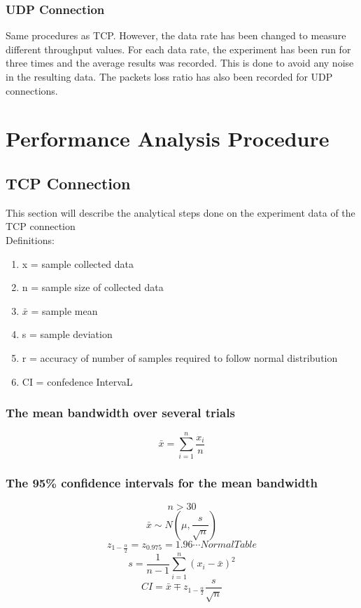 \documentclass[aps,letterpaper,10pt]{revtex4}
\begin{document}
    \subsubsection{UDP Connection}
	Same procedures as TCP. However, the data rate has been changed to measure different throughput values. For each data rate, the experiment has been run for three times and the average results was recorded. This is done to avoid any noise in the resulting data. The packets loss ratio has also been recorded for UDP connections.
\newpage
\section{Performance Analysis Procedure}
    \subsection{TCP Connection}
This section will describe the analytical steps done on the experiment data of the TCP connection\\
Definitions:
    \begin{enumerate}
        \item x = sample collected data
        \item n = sample size of collected data
        \item $\bar{x}$ = sample mean 
        \item s = sample deviation 
        \item r = accuracy of number of samples required to follow normal distribution 
        \item CI = confedence IntervaL 
    \end{enumerate}
    \subsubsection{The mean bandwidth over several trials}
            \[
            \bar{x} = \sum_{i=1}^n{\frac{x_{i}}{n}}
            \]
        \subsubsection{The 95\% confidence intervals for the mean bandwidth}
            \[
            n > 30
            \]
            \[
            \bar{x} \sim N(\mu , \frac{s}{\sqrt{n}})
            \]
            \[
            z_{1-\frac{\alpha}{2}} = z_{0.975} = 1.96 \cdots Normal Table
            \]
            \[
            s = \frac{1}{n-1}\sum_{i=1}^n{(x_{i} - \bar{x})^2}
            \]
            \[
            CI = \bar{x} \mp z_{1-\frac{\alpha}{2}}\frac{s}{\sqrt{n}}
            \]
\end{document}
